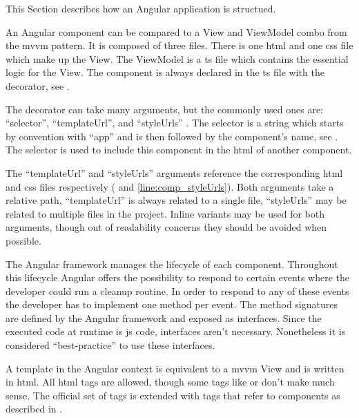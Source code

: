 

This Section describes how an Angular application is structued.


An Angular component can be compared to a View and ViewModel combo from the \gls{mvvm} pattern. It is composed of three files. There is one \gls{html} and one \gls{css} file which make up the View. The ViewModel is a \gls{ts} file which contains the essential logic for the View. The component is always declared in the \gls{ts} file with the  decorator, see .


The  decorator can take many arguments, but the commonly used ones are: \enquote{selector}, \enquote{templateUrl}, and \enquote{styleUrls} \cite{ngcomponent}. The selector is a string which starts by convention with \enquote{app} and is then followed by the component's name, see . The selector is used to include this component in the \gls{html} of another component.

The \enquote{templateUrl} and \enquote{styleUrls} arguments reference the corresponding \gls{html} and \gls{css} files respectively ( and \ref{line:comp_styleUrls}). Both arguments take a relative path, \enquote{templateUrl} is always related to a single file, \enquote{styleUrls} may be related to multiple files in the project. Inline variants may be used for both arguments, though out of readability concerns they should be avoided when possible.

The Angular framework manages the lifecycle of each component. Throughout this lifecycle Angular offers the possibility to respond to certain events \zB {} where the developer could run a cleanup routine. In order to respond to any of these events the developer has to implement one method per event. The method signatures are defined by the Angular framework and exposed as interfaces. Since the executed code at runtime is \gls{js} code, interfaces aren't necessary. Nonetheless it is considered \enquote{best-practice} to use these interfaces.

A template in the Angular context is equivalent to a \gls{mvvm} View and is written in \gls{html}. All \gls{html} tags are allowed, though some tags like  or  don't make much sense. The official set of tags is extended with tags that refer to components as described in .

